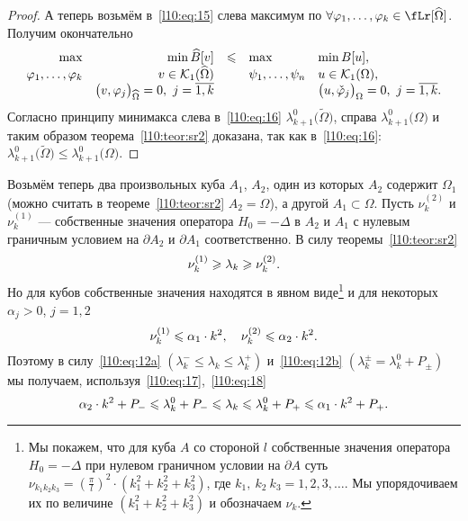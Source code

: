 \begin{proof}
	А теперь возьмём в~\eqref{l10:eq:15} слева максимум по $\forall\phi_1,\ldots,\phi_k\in\fLr[\widehat{\Omega}]$. Получим окончательно
	\begin{equation}\label{l10:eq:16}
		\hfill\begin{array}{rrcll}
			\max&\min\widehat{B}[v]&\leqslant&\max&\min B[u],\\
			\phi_1,\ldots,\phi_k&v\in\K_1(\widehat{\Omega})&  &\psi_1,\ldots,\psi_n &u\in\K_1(\Omega),\\
			&\big(v,\phi_j\big)_{\widehat{\Omega}}=0,\ j=\overline{1,k} & &  &\big(u,\check{\phi}_j\big)_{\Omega}=0,\ j=\overline{1,k}.
		\end{array}\hfill
	\end{equation}	
	Согласно принципу минимакса слева в~\eqref{l10:eq:16} $\lambda_{k+1}^0\big(\widetilde{\Omega}\big)$, справа $\lambda_{k+1}^0\big(\Omega\big)$ и таким образом теорема~\ref{l10:teor:sr2} доказана, так как в~\eqref{l10:eq:16}: $\lambda_{k+1}^0\big(\widetilde{\Omega}\big)\leqslant\lambda_{k+1}^0\big(\Omega\big)$.  
\end{proof}

Возьмём теперь два произвольных куба $A_1$, $A_2$, один из которых $A_2$ содержит $\Omega_1$ (можно считать в теореме~\ref{l10:teor:sr2} $A_2=\widehat{\Omega}$), а другой $A_1\subset\Omega$. Пусть $\nu_k^{(2)}$ и $\nu_k^{(1)}$ --- собственные значения оператора $H_0=-\Delta$ в $A_2$ и $A_1$ с нулевым граничным условием на $\partial A_2$ и $\partial A_1$ соответственно. В силу теоремы~\ref{l10:teor:sr2} 
\begin{equation}\label{l10:eq:17}
	\hfill\nu_k^{(1)}\geqslant\lambda_k\geqslant\nu_k^{(2)}.\hfill	
\end{equation}
Но для кубов собственные значения находятся в явном виде\footnote{Мы покажем, что для куба $A$ со стороной $l$ собственные значения оператора $H_0=-\Delta$ при нулевом граничном условии на $\partial A$ суть $\displaystyle\nu_{k_1 k_2 k_3}=\left(\frac{\pi}{l}\right)^2\cdot\left(k_1^2+k_2^2+k_3^2\right)$, где $k_1,\ k_2\ k_3=1,2,3,\ldots$. Мы упорядочиваем их по величине $\left(k_1^2+k_2^2+k_3^2\right)$ и обозначаем $\nu_k$.} и для некоторых $\alpha_j>0$, $j=1,2$
\begin{equation}\label{l10:eq:18}
	\hfill\nu_k^{(1)}\leqslant\alpha_1\cdot k^2,\quad\nu_k^{(2)}\leqslant\alpha_2\cdot k^2.\hfill
\end{equation}
Поэтому в силу~\eqref{l10:eq:12a} $\displaystyle\left(\lambda_k^{-}\leqslant\lambda_k\leqslant\lambda_k^{+}\right)$  и~\eqref{l10:eq:12b} $\displaystyle\left(\lambda_k^{\pm}=\lambda_k^0+P_{\pm}\right)$ мы получаем, используя~\eqref{l10:eq:17},~\eqref{l10:eq:18} 
\begin{equation*}
	\hfill\alpha_2\cdot k^2+P_{-}\leqslant\lambda_k^{0}+P_{-}\leqslant\lambda_k\leqslant\lambda_k^{0}+P_{+}\leqslant\alpha_1\cdot k^2+P_{+}.\hfill
\end{equation*}

